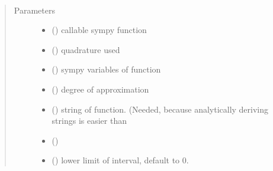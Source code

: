 \documentclass[letterpaper,10pt,english]{sphinxmanual}
\begin{document}
\begin{fulllineitems}
\label{\detokenize{index:Studienprojekt_Smolyak_qmc_one_point.error_smolyak}}~\begin{quote}\begin{description}
\item[{Parameters}] \leavevmode\begin{itemize}
\item {} 
 () \textendash{} callable sympy function

\item {} 
 () \textendash{} quadrature used

\item {} 
 () \textendash{} sympy variables of function

\item {} 
 () \textendash{} degree of approximation

\item {} 
 () \textendash{} string of function. (Needed, because analytically deriving strings is easier than

\item {} 
\sphinxstyleliteralstrong{\sphinxupquote{)}} () \textendash{} 

\item {} 
 (\sphinxstyleliteralemphasis{\sphinxupquote{, }}) \textendash{} lower limit of interval, default to 0.


\end{itemize}
\end{description}
\end{quote}
\end{fulllineitems}
\end{document}
